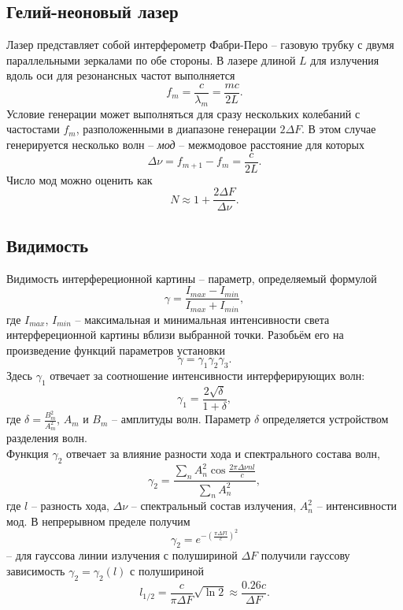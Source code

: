 \documentclass[a4paper, 12pt]{article}
\begin{document}
\subsection*{Гелий-неоновый лазер}
Лазер представляет собой интерферометр Фабри-Перо -- газовую трубку с двумя параллельными зеркалами по обе стороны. В лазере длиной $L$ для излучения вдоль оси для резонансных частот выполняется
\begin{equation}
f_m = \dfrac{c}{\lambda_m} = \dfrac{mc}{2L}.
\end{equation}
Условие генерации может выполняться для сразу нескольких колебаний с частостами $f_m$, разположенными в диапазоне генерации $2\Delta F$. В этом случае генерируется несколько волн -- \textit{мод} -- межмодовое расстояние для которых
\begin{equation}
\Delta \nu = f_{m+1} - f_m = \dfrac{c}{2L}.
\end{equation}
Число мод можно оценить как 
\begin{equation}
N \approx 1 + \dfrac{2\Delta F}{\Delta \nu}.
\end{equation}
\subsection*{Видимость}
Видимость интерфереционной картины -- параметр, определяемый формулой
\begin{equation}
\gamma = \dfrac{I_{max} - I_{min}}{I_{max} + I_{min}},
\end{equation}
где $I_{max}$, $I_{min}$ -- максимальная и минимальная интенсивности света интерфереционной картины вблизи выбранной точки. Разобьём его на произведение функций параметров установки
$$
\gamma = \gamma_1 \gamma_2 \gamma_3.
$$
Здесь $\gamma_1$ отвечает за соотношение интенсивности интерферирующих волн:
\begin{equation}
\gamma_1 = \dfrac{2\sqrt{\delta}}{1+\delta},
\end{equation}
где $\delta = \frac{B_m^2}{A_m^2}$, $A_m$ и $B_m$ -- амплитуды волн. Параметр $\delta$ определяется устройством разделения волн.\\
Функция $\gamma_2$ отвечает за влияние разности хода и спектрального состава волн,
$$
\gamma_2 = \dfrac{\sum\limits_n A^2_n \cos \frac{2\pi \Delta \nu n l}{c}}{\sum\limits_n A_n^2},
$$
где $l$ -- разность хода, $\Delta \nu$ -- спектральный состав излучения, $A_n^2$ -- интенсивности мод. В непрерывном пределе получим
$$
\gamma_2 = e^{-\left(\frac{\pi \Delta F l}{c}\right)^2}
$$
-- для гауссова линии излучения с полушириной $\Delta F$ получили гауссову зависимость $\gamma_2 = \gamma_2(l)$ с полушириной 
\begin{equation}
l_{1/2} = \dfrac{c}{\pi \Delta F}\sqrt{\ln 2} \approx \dfrac{0.26 c}{\Delta F}.
\end{equation}
\end{document}
